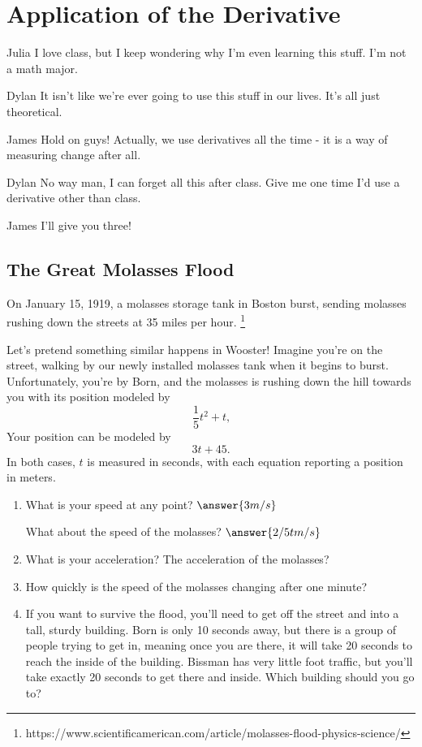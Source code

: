 \documentclass{ximera}
\begin{document}
\section{Application of the Derivative}
\begin{dialogue}
\item[Julia] I love class, but I keep wondering why I'm even learning this stuff. I'm not a math major.
\item[Dylan] It isn't like we're ever going to use this stuff in our lives. It's all just theoretical.
\item[James] Hold on guys! Actually, we use derivatives all the time - it is a way of measuring change after all.
\item[Dylan] No way man, I can forget all this after class. Give me one time I'd use a derivative other than class.
\item[James] I'll give you three!
\end{dialogue}
\subsection{The Great Molasses Flood}
On January 15, 1919, a molasses storage tank in Boston burst, sending molasses rushing down the streets at 35 miles per hour. \footnote{https://www.scientificamerican.com/article/molasses-flood-physics-science/}

Let's pretend something similar happens in Wooster! Imagine you're on the street, walking by our newly installed molasses tank when it begins to burst. Unfortunately, you're by Born, and the molasses is rushing down the hill towards you with its position modeled by $$\frac{1}{5}t^2+t \text{,}$$ Your position can be modeled by $$3t+45 \text{.}$$ In both cases, $t$ is measured in seconds, with each equation reporting a position in meters.

\begin{enumerate}
\item{\begin{question}
What is your speed at any point?  $\answer{3 m/s}$
\end{question}
\begin{question}
What about the speed of the molasses? $\answer{2/5 t m/s}$
\end{question}}
\item{What is your acceleration? The acceleration of the molasses?}
\item{How quickly is the speed of the molasses changing after one minute?}
\item{If you want to survive the flood, you'll need to get off the street and into a tall, sturdy building. Born is only 10 seconds away, but there is a group of people trying to get in, meaning once you are there, it will take 20 seconds to reach the inside of the building. Bissman has very little foot traffic, but you'll take exactly 20 seconds to get there and inside. Which building should you go to?}
\end{enumerate}
\end{document}

